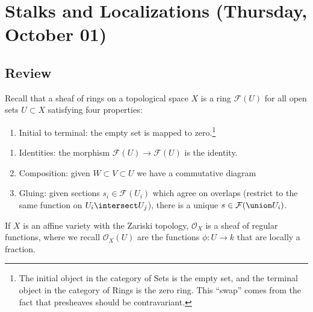 \hypertarget{stalks-and-localizations-thursday-october-01}{%
\section{Stalks and Localizations (Thursday, October
01)}\label{stalks-and-localizations-thursday-october-01}}

\hypertarget{review}{%
\subsection{Review}\label{review}}

Recall that a sheaf of rings on a topological space \(X\) is a ring
\(\mathcal{F}(U)\) for all open sets \(U\subset X\) satisfying four
properties:

\begin{enumerate}
\def\labelenumi{\arabic{enumi}.}
\tightlist
\item
  Initial to terminal: the empty set is mapped to zero.\footnote{The
    initial object in the category of Sets is the empty set, and the
    terminal object in the category of Rings is the zero ring. This
    ``swap'' comes from the fact that presheaves should be
    contravariant.}
\end{enumerate}

\begin{enumerate}
\def\labelenumi{\arabic{enumi}.}
\setcounter{enumi}{1}
\item
  Identities: the morphism \(\mathcal{F}(U)\to \mathcal{F}(U)\) is the
  identity.
\item
  Composition: given \(W\subset V\subset U\) we have a commutative
  diagram

  \begin{center}
  \end{center}
\item
  Gluing: given sections \(s_i \in\mathcal{F}(U_i)\) which agree on
  overlaps (restrict to the same function on \(U_i\intersect U_j\)),
  there is a unique \(s\in \mathcal{F}(\union U_i)\).
\end{enumerate}

\begin{example}

If \(X\) is an affine variety with the Zariski topology,
\(\mathcal{O}_X\) is a sheaf of regular functions, where we recall
\(\mathcal{O}_X(U)\) are the functions \(\phi: U\to k\) that are locally
a fraction.

\end{example}


